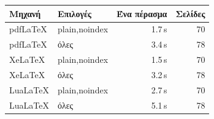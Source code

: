 \begin{center}\begin{tabular}{@{}llrr@{}}
\toprule
\textbf{Μηχανή} & \textbf{Επιλογές} & \textbf{Ένα πέρασμα} & \textbf{Σελίδες}\\
\midrule
pdfLaTeX & plain,noindex & 1.7\,s & 70\\
pdfLaTeX & όλες & 3.4\,s & 78\\
XeLaTeX & plain,noindex & 1.5\,s & 70\\
XeLaTeX & όλες & 3.2\,s & 78\\
LuaLaTeX & plain,noindex & 2.7\,s & 70\\
LuaLaTeX & όλες & 5.1\,s & 78\\
\bottomrule
\end{tabular}\end{center}

